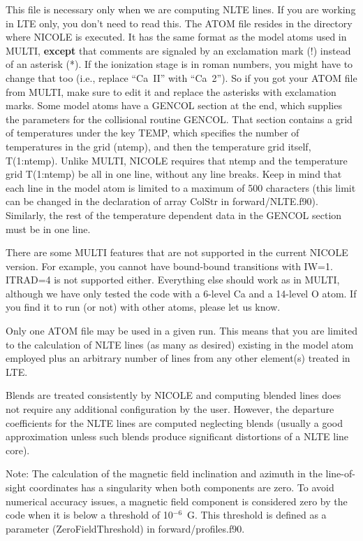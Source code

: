 This file is necessary only when we are computing NLTE lines. If you
are working in LTE only, you don't need to read this. The ATOM file
resides in the directory where NICOLE is executed. It has the same
format as the model atoms used in MULTI, {\bf except} that comments
are signaled by an exclamation mark (!)  instead of an asterisk
(*). If the ionization stage is in roman numbers, you might have to
change that too (i.e., replace ``Ca~II'' with ``Ca~2''). So if you got
your ATOM file from MULTI, make sure to edit it and replace the
asterisks with exclamation marks. Some model atoms have a GENCOL
section at the end, which supplies the parameters for the collisional
routine GENCOL. That section contains a grid of temperatures under the
key TEMP, which specifies the number of temperatures in the grid
(ntemp), and then the temperature grid itself, T(1:ntemp). Unlike
MULTI, NICOLE requires that ntemp and the temperature grid T(1:ntemp)
be all in one line, without any line breaks. Keep in mind that each
line in the model atom is limited to a maximum of 500 characters (this
limit can be changed in the declaration of array ColStr in
forward/NLTE.f90). Similarly, the rest of the temperature dependent
data in the GENCOL section must be in one line.

There are some MULTI features that are not supported in the current
NICOLE version. For example, you cannot have bound-bound transitions
with IW=1. ITRAD=4 is not supported either. Everything else should
work as in MULTI, although we have only tested the code with a 6-level
Ca and a 14-level O atom. If you find it to run (or not) with other
atoms, please let us know.

Only one ATOM file may be used in a given run. This means that
you are limited to the calculation of NLTE lines (as many as desired)
existing in the model atom employed plus an arbitrary number of lines
from any other element(s) treated in LTE. 

Blends are treated consistently by NICOLE and computing blended lines
does not require any additional configuration by the user. However,
the departure coefficients for the NLTE lines are computed neglecting
blends (usually a good approximation unless such blends produce
significant distortions of a NLTE line core).

Note: The calculation of the magnetic field inclination and azimuth in
the line-of-sight coordinates has a singularity when both components
are zero. To avoid numerical accuracy issues, a magnetic field
component is considered zero by the code when it is below a threshold
of 10$^{-6}$~G. This threshold is defined as a parameter
(ZeroFieldThreshold) in forward/profiles.f90.

